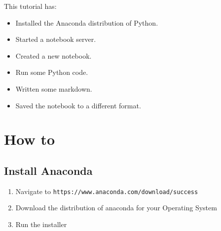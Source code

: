 \begin{note}
This tutorial has:
\begin{itemize}
\item 

Installed the Anaconda distribution of Python.

\item 

Started a notebook server.

\item 

Created a new notebook.

\item 

Run some Python code.

\item 

Written some markdown.

\item 

Saved the notebook to a different format.

\end{itemize}
\end{note}




\section{How to}

\subsection{Install Anaconda}

\begin{enumerate}

\item 

Navigate to \texttt{https://www.anaconda.com/download/success}

\item 

Download the distribution of anaconda for your Operating System

\item 

Run the installer

\end{enumerate}


